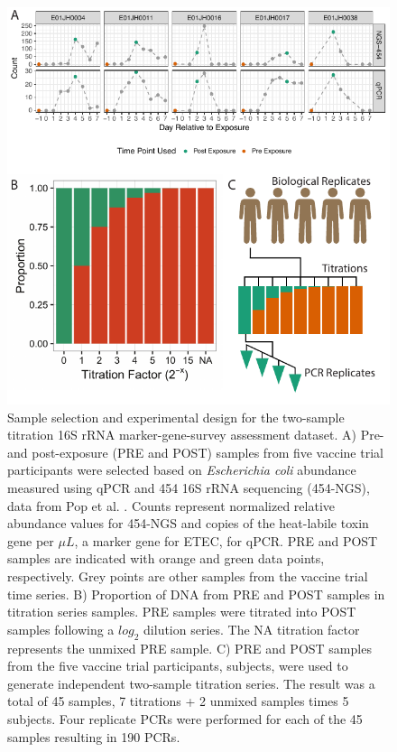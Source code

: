 \documentclass[linenumbers]{bmcart}
\begin{document}
\begin{figure}
\centering
\includegraphics{experimentalDesign.pdf}
\caption{\label{fig:countExperimentalDesign}Sample selection and
experimental design for the two-sample titration 16S rRNA
marker-gene-survey assessment dataset. A) Pre- and post-exposure (PRE
and POST) samples from five vaccine trial participants were selected
based on \textit{Escherichia coli} abundance measured using qPCR and 454
16S rRNA sequencing (454-NGS), data from Pop et al. \cite{pop2016individual}.
Counts represent normalized relative abundance values for 454-NGS and
copies of the heat-labile toxin gene per \(\mu L\), a marker gene for
ETEC, for qPCR. PRE and POST samples are indicated with orange and green
data points, respectively. Grey points are other samples from the
vaccine trial time series. B) Proportion of DNA from PRE and POST
samples in titration series samples. PRE samples were titrated into POST
samples following a \(log_2\) dilution series. The NA titration factor
represents the unmixed PRE sample. C) PRE and POST samples from the five
vaccine trial participants, subjects, were used to generate independent
two-sample titration series. The result was a total of 45 samples, 7
titrations + 2 unmixed samples times 5 subjects. Four replicate PCRs
were performed for each of the 45 samples resulting in 190 PCRs.}
\end{figure}
\end{document}
